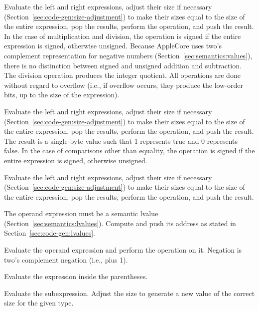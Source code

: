 \documentclass[10pt]{article}
\begin{document}
 Evaluate the left and right expressions, adjust their
size if necessary (Section~\ref{sec:code-gen:size-adjustment}) to make
their sizes equal to the size of the entire expression, pop the
results, perform the operation, and push the result.  In the case of
multiplication and division, the operation is signed if the entire
expression is signed, otherwise unsigned.  Because AppleCore uses
two's complement representation for negative numbers
(Section~\ref{sec:semantics:values}), there is no distinction between
signed and unsigned addition and subtraction.  The division operation
produces the integer quotient.  All operations are done without regard
to overflow (i.e., if overflow occurs, they produce the low-order
bits, up to the size of the expression).

 Evaluate the left and right expressions, adjust
their size if necessary (Section~\ref{sec:code-gen:size-adjustment})
to make their sizes equal to the size of the entire expression, pop
the results, perform the operation, and push the result.  The result
is a single-byte value such that 1 represents true and 0 represents
false.  In the case of comparisons other than equality, the operation
is signed if the entire expression is signed, otherwise unsigned.

Evaluate the left and right expressions, adjust their size if
necessary (Section~\ref{sec:code-gen:size-adjustment}) to make their
sizes equal to the size of the entire expression, pop the results,
perform the operation, and push the result.

%
 The operand expression must be a
semantic lvalue (Section~\ref{sec:semantics:lvalues}).  Compute and
push its address as stated in Section~\ref{sec:code-gen:lvalues}.

Evaluate the operand expression and perform the operation on it.
Negation is two's complement negation (i.e.,  plus 1).

 Evaluate the expression inside the
parentheses.

 Evaluate the subexpression.  Adjust the
size to generate a new value of the correct size for the given type.
\end{document}
